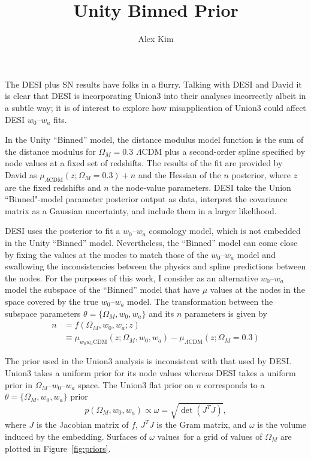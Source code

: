\documentclass[11pt, oneside]{article}   	%
\title{Unity Binned Prior}
\author{Alex Kim}
\begin{document}
\maketitle

The DESI plus SN results have folks in a flurry.  Talking with DESI and David it is clear that DESI is incorporating Union3
into their analyses incorrectly albeit in a subtle way;  it is of interest to explore how misapplication
of Union3 could affect  DESI $w_0$--$w_a$  fits.

In the Unity ``Binned'' model, the distance modulus model function
is the sum of the distance modulus for $\Omega_M=0.3$  $\Lambda$CDM plus a second-order spline specified by node values
at a fixed set of redshifts.  The results of the fit are provided by David as
$\mu_{\Lambda \text{CDM}}(z;\Omega_M=0.3) + n$ and the  Hessian of the $n$ posterior,
where $z$ are the fixed redshifts and $n$ the node-value parameters.
DESI take the Union ``Binned"-model parameter posterior output as data, interpret the covariance matrix as a Gaussian uncertainty,
and include them in a larger likelihood. 

DESI uses the posterior to fit a $w_0$--$w_a$ cosmology model, which is not embedded in the Unity ``Binned'' model.  Nevertheless,
the ``Binned'' model can come close by fixing the values at the modes to match those of the $w_0$--$w_a$  model and swallowing the
inconsistencies between the physics and spline predictions between the nodes.  For the purposes of this work, I consider
as an alternative  $w_0$--$w_a$ model  the subspace
of the ``Binned'' model that have $\mu$ values at the nodes in the space  covered by the true $w_0$--$w_a$
model.  The transformation between the subspace parameters $\theta=\{\Omega_M, w_0, w_a\}$ and its $n$ parameters is given by
\begin{align}
	n &= f(\Omega_M, w_0, w_a; z) \\
	& \equiv \mu_{w_0 w_a \text{CDM}}(z;\Omega_M, w_0, w_a)  - \mu_{\Lambda \text{CDM}}(z;\Omega_M=0.3) 
\end{align}

The prior used in the Union3 analysis is inconsistent with that used by DESI.  Union3 takes a uniform prior for its node values whereas
DESI takes a uniform prior in $\Omega_M$--$w_0$--$w_a$ space.  The Union3 flat prior
on $n$  corresponds to a $\theta=\{\Omega_M, w_0, w_a\}$ prior
\begin{equation}
p(\Omega_M, w_0,w_a) \propto \omega =  \sqrt{\det{\left(J^T J\right)}},
\end{equation}
where $J$ is the Jacobian matrix of $f$, $J^TJ$ is the Gram matrix, and $\omega$ is the volume induced by the embedding.
Surfaces of $\omega$ values\ for a grid of values of $\Omega_M$
are plotted in Figure~\ref{fig:priors}. 
\end{document}
